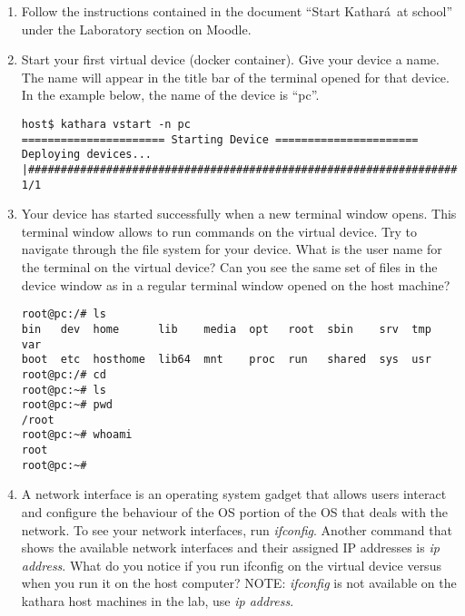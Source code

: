 \documentclass[12pt]{book}
\newcommand{\kathara}{Kathar\'a}
\begin{document}
\begin{enumerate}[label=Activity \arabic*:]
    

\item Follow the instructions contained in the document ``Start \kathara\ at school'' under the Laboratory section on Moodle.
  
\item Start your first virtual device (docker container). Give your device a name. The name will appear in the title bar of the terminal opened for that device. In the example below, the name of the device is ``pc''.

  \begin{lstlisting}
host$ kathara vstart -n pc
====================== Starting Device ======================
Deploying devices... |##################################################################| 1/1
\end{lstlisting}
  
\item Your device has started successfully when a new terminal window opens. This terminal window allows to run commands on the virtual device. Try to navigate through the file system for your device. What is the user name for the terminal on the virtual device? Can you see the same set of files in the device window as in a regular terminal window opened on the host machine?

\begin{lstlisting}
root@pc:/# ls
bin   dev  home      lib    media  opt   root  sbin    srv  tmp  var
boot  etc  hosthome  lib64  mnt    proc  run   shared  sys  usr
root@pc:/# cd 
root@pc:~# ls
root@pc:~# pwd
/root
root@pc:~# whoami
root
root@pc:~# 
\end{lstlisting}

\item A network interface is an operating system gadget that allows users interact and configure the behaviour of the OS portion of the OS that deals with the network. To see your network interfaces, run \emph{ifconfig}. Another command that shows the available network interfaces and their assigned IP addresses is \emph{ip address}. What do you notice if you run ifconfig on the virtual device versus when you run it on the host computer? NOTE: \emph{ifconfig} is not available on the kathara host machines in the lab, use \emph{ip address}.


\end{enumerate}
\end{document}
